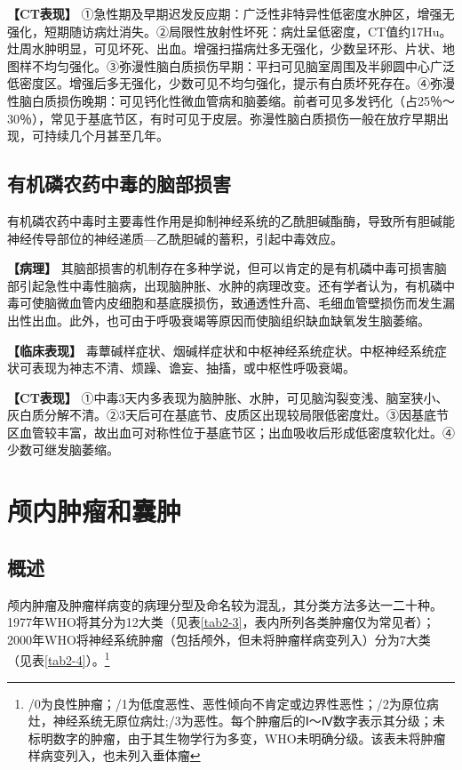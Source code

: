 \textbf{【CT表现】}
①急性期及早期迟发反应期：广泛性非特异性低密度水肿区，增强无强化，短期随访病灶消失。②局限性放射性坏死：病灶呈低密度，CT值约17Hu。灶周水肿明显，可见坏死、出血。增强扫描病灶多无强化，少数呈环形、片状、地图样不均匀强化。③弥漫性脑白质损伤早期：平扫可见脑室周围及半卵圆中心广泛低密度区。增强后多无强化，少数可见不均匀强化，提示有白质坏死存在。④弥漫性脑白质损伤晚期：可见钙化性微血管病和脑萎缩。前者可见多发钙化（占25％～30％），常见于基底节区，有时可见于皮层。弥漫性脑白质损伤一般在放疗早期出现，可持续几个月甚至几年。

\subsection{有机磷农药中毒的脑部损害}

有机磷农药中毒时主要毒性作用是抑制神经系统的乙酰胆碱酯酶，导致所有胆碱能神经传导部位的神经递质---乙酰胆碱的蓄积，引起中毒效应。

\textbf{【病理】}
其脑部损害的机制存在多种学说，但可以肯定的是有机磷中毒可损害脑部引起急性中毒性脑病，出现脑肿胀、水肿的病理改变。还有学者认为，有机磷中毒可使脑微血管内皮细胞和基底膜损伤，致通透性升高、毛细血管壁损伤而发生漏出性出血。此外，也可由于呼吸衰竭等原因而使脑组织缺血缺氧发生脑萎缩。

\textbf{【临床表现】}
毒蕈碱样症状、烟碱样症状和中枢神经系统症状。中枢神经系统症状可表现为神志不清、烦躁、谵妄、抽搐，或中枢性呼吸衰竭。

\textbf{【CT表现】}
①中毒3天内多表现为脑肿胀、水肿，可见脑沟裂变浅、脑室狭小、灰白质分解不清。②3天后可在基底节、皮质区出现较局限低密度灶。③因基底节区血管较丰富，故出血可对称性位于基底节区；出血吸收后形成低密度软化灶。④少数可继发脑萎缩。

\section{颅内肿瘤和囊肿}

\subsection{概述}

颅内肿瘤及肿瘤样病变的病理分型及命名较为混乱，其分类方法多达一二十种。1977年WHO将其分为12大类（见表\ref{tab2-3}，表内所列各类肿瘤仅为常见者）；2000年WHO将神经系统肿瘤（包括颅外，但未将肿瘤样病变列入）分为7大类（见表\ref{tab2-4}）。\footnote{/0为良性肿瘤；/1为低度恶性、恶性倾向不肯定或边界性恶性；/2为原位病灶，神经系统无原位病灶;/3为恶性。每个肿瘤后的Ⅰ～Ⅳ数字表示其分级；未标明数字的肿瘤，由于其生物学行为多变，WHO未明确分级。该表未将肿瘤样病变列入，也未列入垂体瘤}

